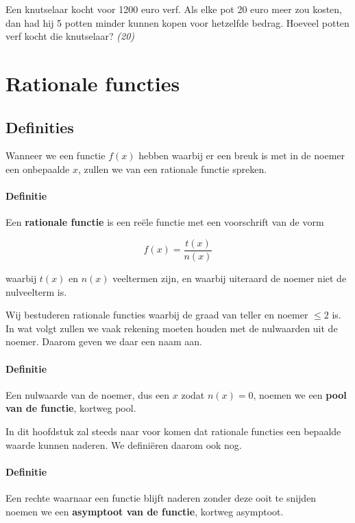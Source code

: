 \documentclass[12pt,twoside,a4paper]{article}
\begin{document}
\begin{oefening}
Een knutselaar kocht voor 1200 euro verf. Als elke pot 20 euro meer zou kosten, dan had hij 5 potten minder kunnen kopen voor hetzelfde bedrag. Hoeveel potten verf kocht die knutselaar? \hfill {\em (20)}
\end{oefening}

\cleardoublepage
\section{Rationale functies}

\subsection{Definities}

Wanneer we een functie $f(x)$ hebben waarbij er een breuk is met in de noemer een onbepaalde $x$, zullen we van een rationale functie spreken.

\paragraph*{Definitie}
\begin{mdframed}
Een {\bf rationale functie} is een reële functie met een voorschrift van de vorm

$$f(x)=\dfrac{t(x)}{n(x)}$$

waarbij $t(x)$ en $n(x)$ veeltermen zijn, en waarbij uiteraard de noemer niet de nulveelterm is.
\end{mdframed}

Wij bestuderen rationale functies waarbij de graad van teller en noemer $\leq 2$ is. In wat volgt zullen we vaak rekening moeten houden met de nulwaarden uit de noemer. Daarom geven we daar een naam aan.

\paragraph*{Definitie}
\begin{mdframed}
Een nulwaarde van de noemer, dus een $x$ zodat $n(x)=0$, noemen we een {\bf pool van de functie}, kortweg pool.
\end{mdframed}


In dit hoofdstuk zal steeds naar voor komen dat rationale functies een bepaalde waarde kunnen naderen. We definiëren daarom ook nog.

\paragraph*{Definitie}
\begin{mdframed}
Een rechte waarnaar een functie blijft naderen zonder deze ooit te snijden noemen we een {\bf asymptoot van de functie}, kortweg asymptoot.
\end{mdframed}
\end{document}
